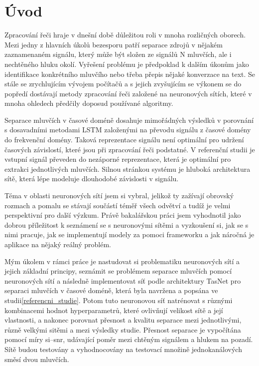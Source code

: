 \chapter{Úvod}


Zpracování řeči hraje v dnešní době důležitou roli v mnoha rozličných oborech. Mezi jedny z hlavních úkolů bezesporu patří separace zdrojů v nějakém zaznamenaném signálu, který může být složen ze signálů N mluvčích, ale i nechtěného hluku okolí. Vyřešení problému je předpoklad k dalším úkonům jako identifikace konkrétního mluvčího nebo třeba přepis nějaké konverzace na text. Se stále se zrychlujícím vývojem počítačů a s jejich zvyšujícím se výkonem se do popředí dostávají metody zpracování řeči založené na neuronových sítích, které v mnoha ohledech předčily doposud používané algoritmy.

Separace mluvčích v časové doméně dosahuje mimořádných výsledků v porovnání s dosavadními metodami LSTM založenými na převodu signálu z časové domény do frekvenční domény. Taková reprezentace signálu není optimální pro udržení časových závislostí, které jsou při zpracování řeči podstatné. V referenční studii je vstupní signál převeden do nezáporné reprezentace, která je optimální pro extrakci jednotlivých mluvčích. Silnou stránkou systému je hluboká architektura sítě, která lépe modeluje dlouhodobé závislosti v signálu.

Téma v oblasti neuronových sítí jsem si vybral, jelikož ty zažívají obrovský rozmach a pomalu se stávají součástí téměř všech odvětví a tudíž je velmi perspektivní pro další výzkum. Právě bakalářskou práci jsem vyhodnotil jako dobrou příležitost k seznámení se s neuronovými sítěmi a vyzkoušení si, jak se s nimi pracuje, jak se implementují modely za pomoci frameworku a jak náročná je aplikace na nějaký reálný problém.

Mým úkolem v rámci práce je nastudovat si problematiku neuronových sítí a jejich základní principy, seznámit se problémem separace mluvčích pomocí neuronových sítí a následně implementovat síť podle architektury TasNet pro separaci mluvčích v časové doméně, která byla navržena a popsána ve studii\ref{referencni_studie}. Potom tuto neuronovou síť natrénovat s různými kombinacemi hodnot hyperparametrů, které ovlivňují velikost sítě a její vlastnosti, a nakonec porovnat přesnost a kvalitu separace mezi jednotlivými, různě velkými sitěmi a mezi výsledky studie. Přesnost separace je vypočítána pomocí míry si--snr, udávající poměr mezi chtěným signálem a hlukem na pozadí. Sítě budou testovány a vyhodnocovány na testovací množině jednokanálových směsí dvou mluvčích.

